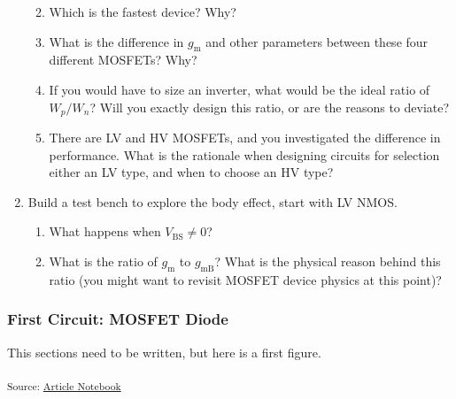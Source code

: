 \documentclass[
  a4paper,
  DIV=11,
  numbers=noendperiod]{scrartcl}
\providecommand{\tightlist}{%
  \setlength{\itemsep}{0pt}\setlength{\parskip}{0pt}}\usepackage{longtable,booktabs,array}
\begin{document}
\begin{enumerate}
  \begin{enumerate}
  \def\labelenumii{\arabic{enumii}.}
  \tightlist
  \item
    Which is the fastest device? Why?
  \item
    What is the difference in \(g_\mathrm{m}\) and other parameters
    between these four different MOSFETs? Why?
  \item
    If you would have to size an inverter, what would be the ideal ratio
    of \(W_p/W_n\)? Will you exactly design this ratio, or are the
    reasons to deviate?
  \item
    There are LV and HV MOSFETs, and you investigated the difference in
    performance. What is the rationale when designing circuits for
    selection either an LV type, and when to choose an HV type?
  \end{enumerate}
\item
  Build a test bench to explore the body effect, start with LV NMOS.

  \begin{enumerate}
  \def\labelenumii{\arabic{enumii}.}
  \tightlist
  \item
    What happens when \(V_\mathrm{BS} \neq 0\)?
  \item
    What is the ratio of \(g_\mathrm{m}\) to \(g_\mathrm{mB}\)? What is
    the physical reason behind this ratio (you might want to revisit
    MOSFET device physics at this point)?
  \end{enumerate}
\end{enumerate}

\subsubsection{First Circuit: MOSFET Diode}\label{sec-mosfet-diode}

This sections need to be written, but here is a first figure.

\textsubscript{Source:
\href{https://iic-jku.github.io/analog-circuit-design/index.qmd.html}{Article
Notebook}}
\end{document}
